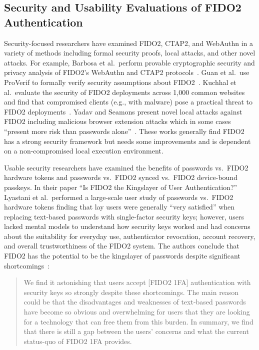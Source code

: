 \subsection{Security and Usability Evaluations of FIDO2 Authentication}
\label{sec:fido2-evals}

Security-focused researchers have examined FIDO2, CTAP2, and WebAuthn in a variety of methods including formal security proofs, local attacks, and other novel attacks. For example, Barbosa et al.\ perform provable cryptographic security and privacy analysis of FIDO2's WebAuthn and CTAP2 protocols~\cite{barbosa_provable_2021}. Guan et al.\ use ProVerif to formally verify security assumptions about FIDO2~\cite{guan_formal_2022}. Kuchhal et al.\ evaluate the security of FIDO2 deployments across 1{,}000 common websites and find that compromised clients (e.g., with malware) pose a practical threat to FIDO2 deployments~\cite{kuchhal_fido2_2023}. Yadav and Seamons present novel local attacks against FIDO2 including malicious browser extension attacks which in some cases ``present more risk than passwords alone''~\cite{yadav_security_2024}. These works generally find FIDO2 has a strong security framework but needs some improvements and is dependent on a non-compromised local execution environment.

Usable security researchers have examined the benefits of passwords vs.\ FIDO2 hardware tokens and passwords vs.\ FIDO2 synced vs.\ FIDO2 device-bound passkeys. In their paper ``Is FIDO2 the Kingslayer of User Authentication?'' Lyastani et al.\ performed a large-scale user study of passwords vs.\ FIDO2 hardware tokens finding that lay users were generally ``very satisfied'' when replacing text-based passwords with single-factor security keys; however, users lacked mental models to understand how security keys worked and had concerns about the suitability for everyday use, authenticator revocation, account recovery, and overall trustworthiness of the FIDO2 system. The authors conclude that FIDO2 has the potential to be the kingslayer of passwords despite significant shortcomings~\cite{lyastani_fido2_2020}:
\begin{quote}
We find it astonishing that users accept [FIDO2 1FA] authentication with security keys so strongly despite these shortcomings. The main reason could be that the disadvantages and weaknesses of text-based passwords have become so obvious and overwhelming for users that they are looking for a technology that can free them from this burden. In summary, we find that there is still a gap between the users' concerns and what the current status-quo of FIDO2 1FA provides.
\end{quote}

